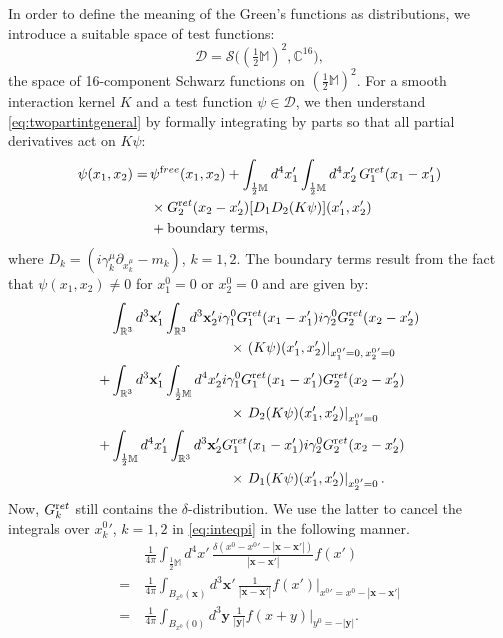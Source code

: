 \documentclass[b5paper,draft,openbib,12pt]{memoir}
\newcommand{\R}{\mathbb{R}}
\newcommand{\CC}{\mathbb{C}}
\newcommand{\M}{\mathbb{M}}
\newcommand{\vx}{\mathbf{x}}
\newcommand{\vy}{\mathbf{y}}
\newcommand{\ret}{{\textup ret}}
\newcommand{\free}{{\textup free}}
\begin{document}
In order to define the meaning of the Green's functions as distributions, we introduce a suitable space of test functions:
\begin{equation}
	\mathscr{D} = \mathscr{S}\big( (\tfrac{1}{2}\M)^2,\CC^{16} \big),
\end{equation}
the space of 16-component Schwarz functions on $(\tfrac{1}{2}\M)^2$.
For a smooth interaction kernel $K$ and a test function $\psi \in \mathscr{D}$, we then understand \eqref{eq:twopartintgeneral} by formally integrating by parts so that all partial derivatives act on $K \psi$:
\begin{align}
  \psi(x_1,x_2) =\, &\psi^\free(x_1,x_2) +\int_{\frac{1}{2}\M} d^4 x_1' \int_{\frac{1}{2}\M} d^4 x_2' \, G_1^\ret(x_1-x_1')\\
  & \times G_2^\ret(x_2-x_2') [D_1 D_2(K \psi)](x_1',x_2')\nonumber\\
&+\text{boundary terms},
\label{eq:inteqpi}
\end{align}
where $D_k = (i \gamma_k^\mu \partial_{x_k^\mu} - m_k)$, $k=1,2$. The boundary terms result from the fact that $\psi(x_1,x_2) \neq 0$ for $x_1^0 = 0$ or $x_2^0 =0$ and are given by:
\begin{align}
  &\int_{\R^3} d^3 \vx_1' \int_{\R^3} d^3 \vx_2'  i \gamma_1^0 G_1^\ret(x_1-x_1') i \gamma_2^0 G_2^\ret(x_2-x_2')\\
  &\hspace{3cm}\times  \left.(K \psi)(x_1',x_2') \right|_{{x_1^0}' = 0,\, {x_2^0}' = 0}\nonumber\\
+ &\int_{\R^3} d^3 \vx_1' \int_{\frac{1}{2} \M} d^4 x_2'  i \gamma_1^0 G_1^\ret(x_1-x_1') G_2^\ret(x_2-x_2')  \\
&\hspace{3cm}\times \left.D_2(K \psi)(x_1',x_2') \right|_{{x_1^0}' = 0}\nonumber\\
 +&\int_{\frac{1}{2} \M} d^4 x_1' \int_{\R^3} d^3 \vx_2'  G_1^\ret(x_1-x_1')  i \gamma_2^0 G_2^\ret(x_2-x_2') \\
&\hspace{3cm}\times \left.D_1 (K \psi)(x_1',x_2') \right|_{{x_2^0}' = 0}.
\label{eq:boundaryterms}
\end{align}
Now, $G_k^\ret$ still contains the $\delta$-distribution. We use the latter to cancel the integrals over ${x_k^0}'$, $k=1,2$ in \eqref{eq:inteqpi} in the following manner.
\begin{align}
	&\frac{1}{4\pi} \int_{\tfrac{1}{2}\M} d^4 x' \, \frac{\delta(x^0-{x^0}'-|\vx-\vx'|)}{|\vx-\vx'|} f(x')\\
= ~&\frac{1}{4\pi} \int_{B_{x^0}(\vx)} d^3 \vx' \, \frac{1}{|\vx-\vx'|} f(x')|_{{x^0}'=x^0-|\vx-\vx'|}\nonumber\\
= ~&\frac{1}{4\pi} \int_{B_{x^0}(0)} d^3 \vy\, \frac{1}{|\vy|} f(x +y)|_{y^0=-|\vy|}.
\end{align}
\end{document}
